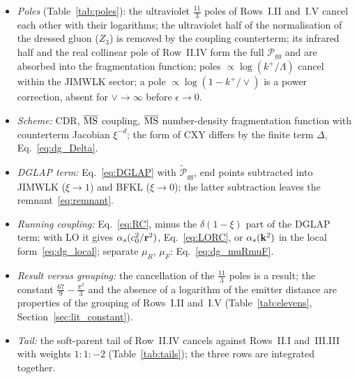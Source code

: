 \begin{summarybox}
\begin{itemize}
\item \emph{Poles} (Table~\ref{tab:poles}): the ultraviolet $\frac{11}{3}$ poles of Rows~I.II and~I.V cancel each other with their logarithms; the ultraviolet half of the normalisation of the dressed gluon ($Z_3$) is removed by the coupling counterterm; its infrared half and the real collinear pole of Row~II.IV form the full $\mathcal P_{gg}$ and are absorbed into the fragmentation function; poles $\propto\log(k^+/\Lambda)$ cancel within the JIMWLK sector; a pole $\propto\log(1-k^+/\vee)$ is a power correction, absent for $\vee\to\infty$ before $\epsilon\to0$.
\item \emph{Scheme:} CDR, $\overline{\rm MS}$ coupling, $\overline{\rm MS}$ number-density fragmentation function with counterterm Jacobian $\xi^{-d}$; the form of CXY differs by the finite term $\Delta$, Eq.~\eqref{eq:dg_Delta}.
\item \emph{DGLAP term:} Eq.~\eqref{eq:DGLAP} with $\widetilde{\mathcal P}_{gg}$, end points subtracted into JIMWLK ($\xi\to1$) and BFKL ($\xi\to0$); the latter subtraction leaves the remnant~\eqref{eq:remnant}.
\item \emph{Running coupling:} Eq.~\eqref{eq:RC}, minus the $\delta(1-\xi)$ part of the DGLAP term; with LO it gives $\alpha_s(c_0^2/\mathbf{r}^2)$, Eq.~\eqref{eq:LORC}, or $\alpha_s(\mathbf{k}^2)$ in the local form~\eqref{eq:dg_local}; separate $\mu_R$, $\mu_F$: Eq.~\eqref{eq:dg_muRmuF}.
\item \emph{Result versus grouping:} the cancellation of the $\frac{11}{3}$ poles is a result; the constant $\frac{67}{9}-\frac{\pi^2}{3}$ and the absence of a logarithm of the emitter distance are properties of the grouping of Rows~I.II and~I.V (Table~\ref{tab:elevens}, Section~\ref{sec:lit_constant}).
\item \emph{Tail:} the soft-parent tail of Row~II.IV cancels against Rows~II.I and~III.III with weights $1:1:-2$ (Table~\ref{tab:tails}); the three rows are integrated together.
\end{itemize}
\end{summarybox}
